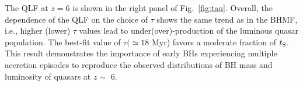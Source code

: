 \documentclass[twocolumn, twocolappendix]{aastex63}
\newcommand{\tlife}{\tau}
\begin{document}
\begin{CJK*}{UTF8}{gbsn}
The QLF at $z=6$ is shown in the right panel of Fig.~\ref{fig:tau}.
Overall, the dependence of the QLF on the choice of $\tau$ shows the same trend as in the BHMF,
i.e., higher (lower) $\tlife$ values lead to under(over)-production of the luminous quasar population.
The best-fit value of $\tlife (\simeq 18$ Myr) favors a moderate fraction of $t_{\rm S}$.
This result demonstrates the importance of early BHs experiencing multiple accretion episodes to 
reproduce the observed distributions of BH mass and luminosity of quasars at $z\sim$ 6.






\vspace{100mm}
{}




\end{CJK*}
\end{document}
